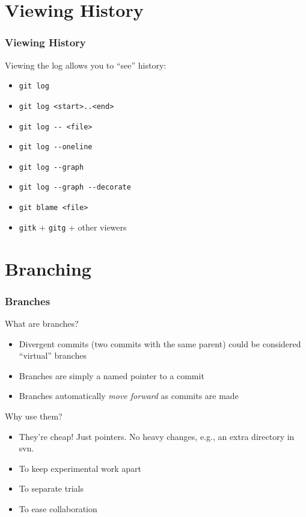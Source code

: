 \documentclass{beamer}
\begin{document}
\section{Viewing History}

\begin{frame}
 \frametitle{Viewing History}

 Viewing the log allows you to ``see'' history:
 \begin{itemize}
  \item \texttt{git log}
  \pause
  \item \texttt{git log \alert{<start>..<end>}}
  \item \texttt{git log \alert{-{}- <file>}}
  \item \texttt{git log \alert{-{}-oneline}}
  \item \texttt{git log \alert{-{}-graph}}
  \item \texttt{git log -{}-graph \alert{-{}-decorate}} \\
 \end{itemize}
 \pause
 \begin{itemize}
  \item \texttt{git blame <file>}
 \end{itemize}
 \pause
 \begin{itemize}
  \item \texttt{gitk} + \texttt{gitg} + other viewers
 \end{itemize}
\end{frame}

\section{Branching}

\begin{frame}
 \frametitle{Branches}

 What are branches?
 \begin{itemize}[<+->]
  \item Divergent commits (two commits with the same parent) could be
        considered ``virtual'' branches
  \item Branches are simply a \alert{named pointer} to a commit
  \item Branches automatically \emph{move forward} as commits are made
 \end{itemize}
 \pause[\thebeamerpauses]
 Why use them?
 \pause
 \begin{itemize}[<+->]
  \item They're cheap! Just pointers. No heavy changes, e.g., an extra
        directory in svn.
  \item To keep experimental work apart
  \item To separate trials
  \item To ease collaboration
 \end{itemize}
\end{frame}
\end{document}
